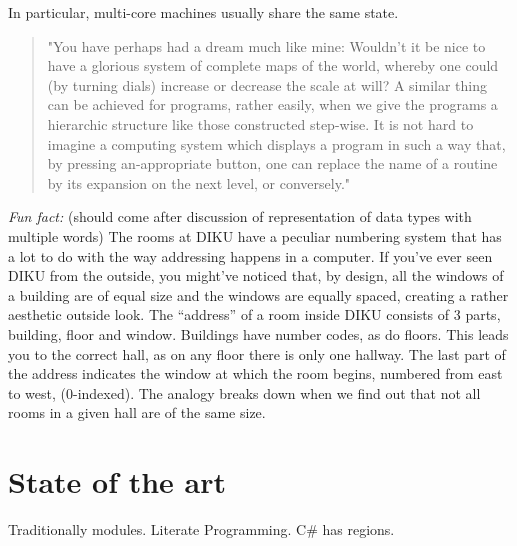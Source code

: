 In particular, multi-core machines usually share the same state.




\begin{quote}"You have perhaps had a dream much like mine: Wouldn't it be nice
to have a glorious system of complete maps of the world, whereby one could (by
turning dials) increase or decrease the scale at will? A similar thing can be
achieved for programs, rather easily, when we give the programs a hierarchic
structure like those constructed step-wise. It is not hard to imagine a
computing system which displays a program in such a way that, by pressing
an-appropriate button, one can replace the name of a routine by its expansion
on the next level, or conversely."\cite{knuth-review-of-sp}\end{quote}

\emph{Fun fact:} (should come after discussion of representation of data types
with multiple words) The rooms at DIKU have a peculiar numbering system that
has a lot to do with the way addressing happens in a computer. If you've ever
seen DIKU from the outside, you might've noticed that, by design, all the
windows of a building are of equal size and the windows are equally spaced,
creating a rather aesthetic outside look. The ``address'' of a room inside DIKU
consists of 3 parts, building, floor and window. Buildings have number codes,
as do floors. This leads you to the correct hall, as on any floor there is only
one hallway. The last part of the address indicates the window at which the
room begins, numbered from east to west, (0-indexed). The analogy breaks down
when we find out that not all rooms in a given hall are of the same size.



\section{State of the art}

Traditionally modules. Literate Programming. C\# has regions.



